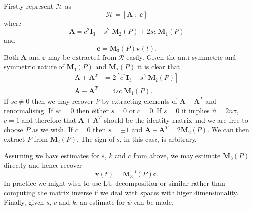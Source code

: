 Firstly represent $\mathcal{H}$ as
\[
\mathcal{H} = [ \mathbf{A}\; ; \; \mathbf{c} ]
\]
where 
\[\mathbf{A} = c^2\mathbf{I}_3 - s^2\;\mathbf{M}_2(P) + 2sc\;\mathbf{M}_1(P)\]
and
\begin{equation}
\mathbf{c} = \mathbf{M}_3(P)\mathbf{v}(t). \label{eqn:b}
\end{equation}
Both $\mathbf{A}$ and $\mathbf{c}$ may be extracted from $\mathcal{R}$ easily.
Given the anti-symmetric and symmetric nature
of $\mathbf{M}_1(P)$ and $\mathbf{M}_2(P)$ it is clear that
\begin{align*}
\mathbf{A} + \mathbf{A}^T &= 
2\left[ c^2\mathbf{I}_3 - s^2\;\mathbf{M}_2(P) \right] \\
\mathbf{A} - \mathbf{A}^T &= 
4sc\;\mathbf{M}_1(P).
\end{align*}
If $sc \ne 0$ then we may recover $P$ by extracting elements of 
$\mathbf{A} - \mathbf{A}^{T}$ and renormalising. If $sc = 0$ then either
$s = 0$ or $c = 0$. If $s = 0$ it implies $\psi = 2n\pi$, $c = 1$ and 
therefore that 
$\mathbf{A} + \mathbf{A}^{T}$ should be the identity matrix and
we are free to choose $P$ as we wish. If $c = 0$ then $s = \pm 1$
and $\mathbf{A} + \mathbf{A}^{T} = 2 \mathbf{M}_2(P)$. We can then
extract $P$ from $\mathbf{M}_2(P)$. The sign of $s$, in this case, is arbitrary.

Assuming we have estimates for $s$, $k$ and $c$ from above, we may
estimate $\mathbf{M}_3(P)$ directly and hence recover
\[
\mathbf{v}(t) = \mathbf{M}^{-1}_3(P) \mathbf{c}.
\]
In practice we might wish to use LU decomposition or similar rather
than computing the matrix inverse if we deal with spaces with higer
dimensionality. Finally, given $s$, $c$ and $k$, an estimate for 
$\psi$ can be made. 
